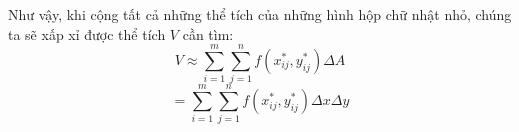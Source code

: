 \documentclass[preview]{standalone}
\begin{document}
\begin{center}
\begin{minipage}{0.7\textwidth}
        Như vậy, khi cộng tất cả những thể tích
        của những hình hộp chữ nhật nhỏ, chúng
        ta sẽ xấp xỉ được thể tích $V$ cần tìm:\\
        $$ V \approx \sum_{i=1}^m \sum_{j=1}^n f(x_{ij}^*, y_{ij}^*)\Delta A $$
        $$ = \sum_{i=1}^m \sum_{j=1}^n f(x_{ij}^*, y_{ij}^*)\Delta x \Delta y $$
        \end{minipage}
\end{center}
\end{document}

